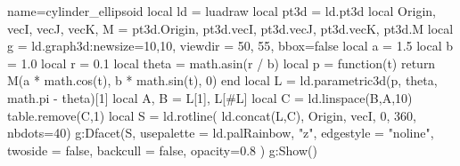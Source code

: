 \documentclass[border=5pt]{standalone}
\begin{document}
\begin{luadraw}{name=cylinder_ellipsoid}
  local ld = luadraw
  local pt3d = ld.pt3d
  local Origin, vecI, vecJ, vecK, M = pt3d.Origin, pt3d.vecI, pt3d.vecJ, pt3d.vecK, pt3d.M
  local g = ld.graph3d:new{size={10,10}, viewdir = {50, 55},  bbox=false}
  local a = 1.5  
  local b = 1.0  
  local r = 0.1   
  local theta = math.asin(r / b)
  local p = function(t) 
    return M(a * math.cos(t), b * math.sin(t), 0) 
  end
  local L = ld.parametric3d(p, theta, math.pi - theta)[1]
  local A, B = L[1], L[#L]
  local C = ld.linspace(B,A,10)
  table.remove(C,1)
  local S = ld.rotline( ld.concat(L,C), {Origin, vecI}, 0, 360, {nbdots=40})
  g:Dfacet(S, {
      usepalette = {ld.palRainbow, "z"},
      edgestyle = "noline",
      twoside = false,
      backcull = false, 
      opacity=0.8
    })
  g:Show()
\end{luadraw}
\end{document}
